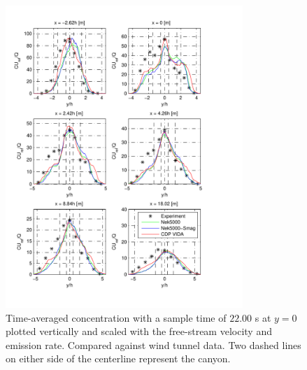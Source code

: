 %
%
%
%
%
%
\newpage
\begin{figure}[h]
    \centering
    \includegraphics[width=0.8\textwidth]{Figures/NekcH_all.pdf}
    \caption{Time-averaged concentration with a sample time of $22.00$ s at $y = 0$ plotted
    vertically and scaled 
    with the free-stream velocity and emission rate. Compared against wind tunnel data.
Two dashed lines on either side of the centerline represent the canyon.}
    \label{fig:cHall}
\end{figure}

